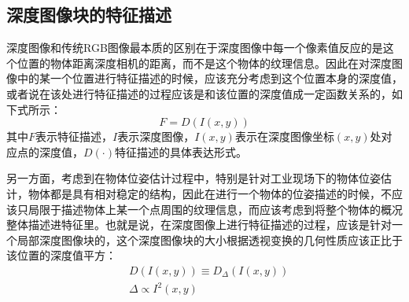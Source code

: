 \subsection{深度图像块的特征描述} %

深度图像和传统RGB图像最本质的区别在于深度图像中每一个像素值反应的是这个位置的物体距离深度相机的距离，而不是这个物体的纹理信息。因此在对深度图像中的某一个位置进行特征描述的时候，应该充分考虑到这个位置本身的深度值，或者说在该处进行特征描述的过程应该是和该位置的深度值成一定函数关系的，如下式所示：
\begin{equation}
	F=D(I(x,y))
\end{equation}
其中$F$表示特征描述，$I$表示深度图像，$I(x,y)$表示在深度图像坐标$(x,y)$处对应点的深度值，$D(\cdot)$特征描述的具体表达形式。

另一方面，考虑到在物体位姿估计过程中，特别是针对工业现场下的物体位姿估计，物体都是具有相对稳定的结构，因此在进行一个物体的位姿描述的时候，不应该只局限于描述物体上某一个点周围的纹理信息，而应该考虑到将整个物体的概况整体描述进特征里。也就是说，在深度图像上进行特征描述的过程，应该是针对一个局部深度图像块的，这个深度图像块的大小根据透视变换的几何性质应该正比于该位置的深度值平方：
\begin{equation}
\begin{aligned}
	& D(I(x,y))\equiv{D_\Delta}(I(x,y)) \\
	& \Delta\propto{I^2(x,y)}
\end{aligned}
\end{equation}

